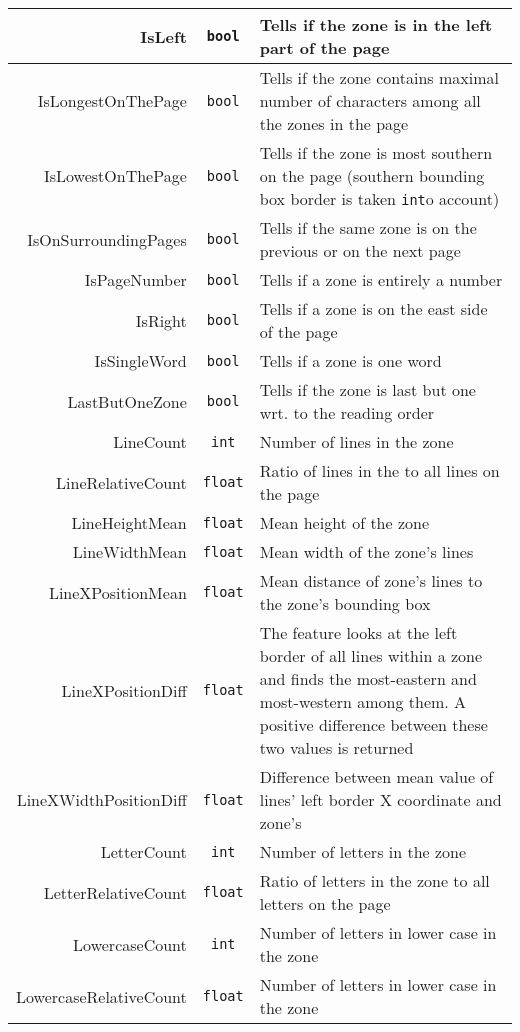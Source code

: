 \begin{appendices}
\begin{longtable}[c]{|r|c|p{8cm}|}
IsLeft & \verb+bool+ & Tells if the zone is in the left part of the page\\ \hline
IsLongestOnThePage & \verb+bool+ & Tells if the zone contains maximal number of characters among all the zones in the page\\ \hline
IsLowestOnThePage & \verb+bool+ & Tells if the zone is most southern on the page (southern bounding box border is taken \verb+int+o account) \\ \hline
IsOnSurroundingPages & \verb+bool+ & Tells if the same zone is on the previous or on the next page \\ \hline
IsPageNumber & \verb+bool+ & Tells if a zone is entirely a number \\ \hline
IsRight & \verb+bool+ & Tells if a zone is on the east side of the page\\ \hline
IsSingleWord & \verb+bool+ & Tells if a zone is one word \\ \hline
LastButOneZone & \verb+bool+ & Tells if the zone is last but one wrt. to the reading order \\ \hline
LineCount & \verb+int+ & Number of lines in the zone\\ \hline
LineRelativeCount & \verb+float+ & Ratio of lines in the to all lines on the page\\ \hline
LineHeightMean & \verb+float+ & Mean height of the zone\\ \hline
LineWidthMean & \verb+float+ & Mean width of the zone's lines\\ \hline
LineXPositionMean & \verb+float+ & Mean distance of zone's lines to the zone's bounding box \\ \hline
LineXPositionDiff & \verb+float+ & The feature looks at the left border of all lines within a zone and finds the most-eastern and most-western among them. A positive difference between these two values is returned\\ \hline
LineXWidthPositionDiff & \verb+float+ & Difference between mean value of lines' left border X coordinate and zone's  \\ \hline
LetterCount & \verb+int+ & Number of letters in the zone\\ \hline
LetterRelativeCount & \verb+float+ & Ratio of letters in the zone to all letters on the page\\ \hline
LowercaseCount & \verb+int+ & Number of letters in lower case in the zone\\ \hline
LowercaseRelativeCount & \verb+float+ & Number of letters in lower case in the zone\\ \hline

\end{longtable}
\end{appendices}
